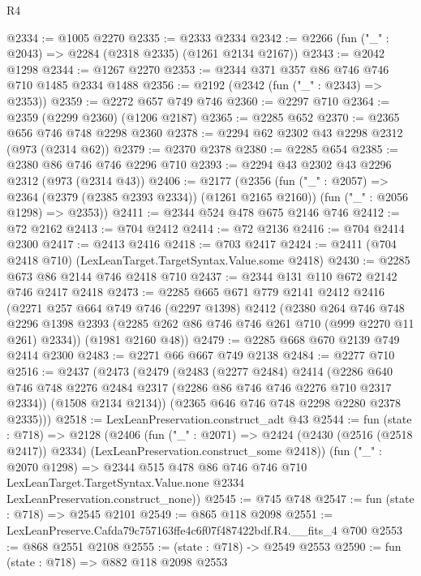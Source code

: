 \begin{lexlean}{R4}
\begin{coremodule}
@2334 := @1005 @2270
@2335 := @2333 @2334
@2342 := @2266 (fun ("_" : @2043) => @2284 (@2318 @2335) (@1261 @2134 @2167))
@2343 := @2042 @1298
@2344 := @1267 @2270
@2353 := @2344 @371 @357 @86 @746 @746 @710 @1485 @2334 @1488
@2356 := @2192 (@2342 (fun ("_" : @2343) => @2353))
@2359 := @2272 @657 @749 @746
@2360 := @2297 @710
@2364 := @2359 (@2299 @2360) (@1206 @2187)
@2365 := @2285 @652
@2370 := @2365 @656 @746 @748 @2298 @2360
@2378 := @2294 @62 @2302 @43 @2298 @2312 (@973 (@2314 @62))
@2379 := @2370 @2378
@2380 := @2285 @654
@2385 := @2380 @86 @746 @746 @2296 @710
@2393 := @2294 @43 @2302 @43 @2296 @2312 (@973 (@2314 @43))
@2406 := @2177
    (@2356
      (fun ("_" : @2057) => @2364 (@2379 (@2385 @2393 @2334)) (@1261 @2165 @2160))
      (fun ("_" : @2056 @1298) => @2353))
@2411 := @2344 @524 @478 @675 @2146 @746
@2412 := @72 @2162
@2413 := @704 @2412
@2414 := @72 @2136
@2416 := @704 @2414 @2300
@2417 := @2413 @2416
@2418 := @703 @2417
@2424 := @2411 (@704 @2418 @710) (LexLeanTarget.TargetSyntax.Value.some @2418)
@2430 := @2285 @673 @86 @2144 @746 @2418 @710
@2437 := @2344 @131 @110 @672 @2142 @746 @2417 @2418
@2473 := @2285
    @665
    @671
    @779
    @2141
    @2412
    @2416
    (@2271
      @257
      @664
      @749
      @746
      (@2297 @1398)
      @2412
      (@2380
        @264
        @746
        @748
        @2296
        @1398
        @2393
        (@2285 @262 @86 @746 @746 @261 @710 (@999 @2270 @11 @261) @2334))
      (@1981 @2160 @48))
@2479 := @2285 @668 @670 @2139 @749 @2414 @2300
@2483 := @2271 @66 @667 @749 @2138
@2484 := @2277 @710
@2516 := @2437
    (@2473
      (@2479
        (@2483
          (@2277 @2484)
          @2414
          (@2286 @640 @746 @748 @2276 @2484 @2317 (@2286 @86 @746 @746 @2276 @710 @2317 @2334))
          (@1508 @2134 @2134))
        (@2365 @646 @746 @748 @2298 @2280 @2378 @2335)))
@2518 := LexLeanPreservation.construct_adt @43
@2544 := fun (state : @718) =>
  @2128
    (@2406
      (fun ("_" : @2071) =>
      @2424 (@2430 (@2516 (@2518 @2417)) @2334) (LexLeanPreservation.construct_some @2418))
      (fun ("_" : @2070 @1298) =>
      @2344
        @515
        @478
        @86
        @746
        @746
        @710
        LexLeanTarget.TargetSyntax.Value.none
        @2334
        LexLeanPreservation.construct_none))
@2545 := @745 @748
@2547 := fun (state : @718) => @2545 @2101
@2549 := @865 @118 @2098
@2551 := LexLeanPreserve.Cafda79c757163ffe4c6f07f487422bdf.R4.__fits_4 @700
@2553 := @868 @2551 @2108
@2555 := (state : @718) -> @2549 @2553
@2590 := fun (state : @718) =>
  @882
    @118
    @2098
    @2553

\end{coremodule}
\end{lexlean}
